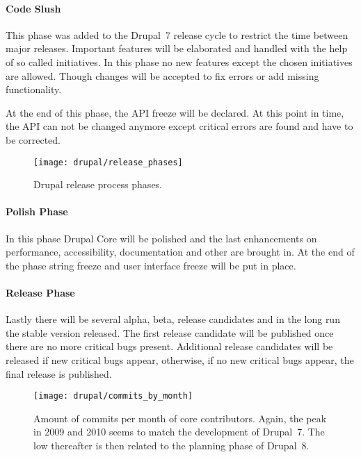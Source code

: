 \paragraph{Code Slush}

This phase was added to the Drupal~7 release cycle to restrict the time between
major releases. Important features will be elaborated and handled with the help
of so called initiatives. In this phase no new features except the chosen
initiatives are allowed. Though changes will be accepted to fix errors or add
missing functionality.

At the end of this phase, the \ac{API} freeze will be declared. At this point
in time, the \ac{API} can not be changed anymore except critical errors are
found and have to be corrected.

\begin{figure}[htbp]
  \centering
  \texttt{[image: drupal/release\_phases]}
  \caption[Drupal release process phases]{Drupal release process phases.}
\end{figure}

\paragraph{Polish Phase}

In this phase Drupal Core will be polished and the last enhancements on
performance, accessibility, documentation and other are brought in. At the end
of the phase string freeze and user interface freeze will be put in place.

\paragraph{Release Phase}

Lastly there will be several alpha, beta, release candidates and in the long
run the stable version released. The first release candidate will be published
once there are no more critical bugs present. Additional release candidates
will be released if new critical bugs appear, otherwise, if no new critical
bugs appear, the final release is published.

\begin{figure}[htbp]
  \centering
  \texttt{[image: drupal/commits\_by\_month]}
  \caption[Commits by month, Drupal]
  {Amount of commits per month of core contributors. Again, the peak in 2009
    and 2010 seems to match the development of Drupal~7. The low thereafter
    is then related to the planning phase of Drupal~8.}
\end{figure}

